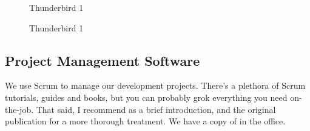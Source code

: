 \documentclass[11pt]{article}
\begin{document}
\begin{figure}
\caption{\label{fig:thunderbird2} Thunderbird 1}
\end{figure}

\begin{figure}
\caption{\label{fig:thunderbird3} Thunderbird 1}
\end{figure}

\subsection{Project Management Software}

We use Scrum to manage our development projects.  There's a plethora of Scrum tutorials, guides and books, but you can probably grok everything you need on-the-job.  That said, I recommend \cite{scrum-guide} as a brief introduction, and the original publication \cite{scrum-book} for a more thorough treatment.  We have a copy of \cite{scrum-book} in the office.
\end{document}
